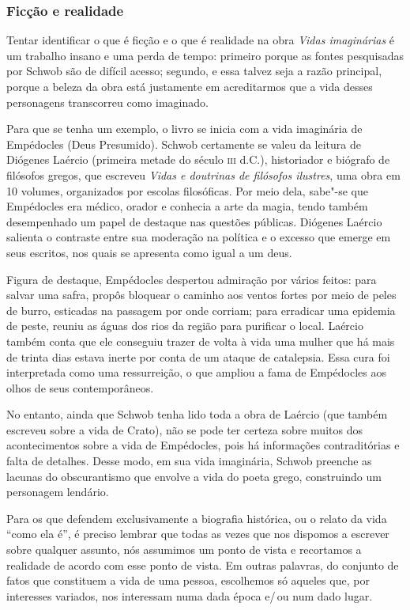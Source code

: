 \documentclass[12pt]{extarticle}
\begin{document}
\subsubsection{Ficção e realidade}

Tentar identificar o que é ficção e o que é realidade na obra \emph{Vidas
imaginárias} é um trabalho insano e uma perda de tempo: primeiro porque
as fontes pesquisadas por Schwob são de difícil acesso; segundo, e essa
talvez seja a razão principal, porque a beleza da obra está justamente
em acreditarmos que a vida desses personagens transcorreu como
imaginado.

Para que se tenha um exemplo, o livro se inicia com a vida imaginária
de Empédocles (Deus Presumido). Schwob certamente se valeu da leitura
de Diógenes Laércio (primeira metade do século \textsc{iii} d.C.), historiador e
biógrafo de filósofos gregos, que escreveu \emph{Vidas e doutrinas de
filósofos ilustres}, uma obra em 10 volumes, organizados por escolas
filosóficas. Por meio dela, sabe"-se que Empédocles era médico, orador e
conhecia a arte da magia, tendo também desempenhado um papel de destaque
nas questões públicas. Diógenes Laércio salienta o contraste entre sua
moderação na política e o excesso que emerge em seus escritos, nos quais
se apresenta como igual a um deus.

Figura de destaque, Empédocles despertou admiração por vários feitos:
para salvar uma safra, propôs bloquear o caminho aos ventos fortes por
meio de peles de burro, esticadas na passagem por onde corriam; para
erradicar uma epidemia de peste, reuniu as águas dos rios da região para
purificar o local. Laércio também conta que ele conseguiu trazer de
volta à vida uma mulher que há mais de trinta dias estava inerte por
conta de um ataque de catalepsia. Essa cura foi interpretada como uma
ressurreição, o que ampliou a fama de Empédocles aos olhos de seus
contemporâneos.

No entanto, ainda que Schwob tenha lido toda a obra de Laércio (que
também escreveu sobre a vida de Crato), não se pode ter certeza sobre
muitos dos acontecimentos sobre a vida de Empédocles, pois há
informações contraditórias e falta de detalhes. Desse modo, em sua vida
imaginária, Schwob preenche as lacunas do obscurantismo que envolve a
vida do poeta grego, construindo um personagem lendário.

Para os que defendem exclusivamente a biografia histórica, ou o relato
da vida ``como ela é'', é preciso lembrar que todas as vezes que nos
dispomos a escrever sobre qualquer assunto, nós assumimos um ponto de
vista e recortamos a realidade de acordo com esse ponto de vista. Em
outras palavras, do conjunto de fatos que constituem a vida de uma
pessoa, escolhemos só aqueles que, por interesses variados, nos
interessam numa dada época e/\,ou num dado lugar.
\end{document}
